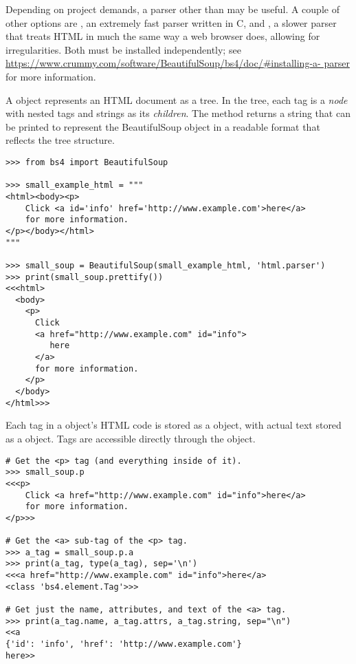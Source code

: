 \begin{info}
Depending on project demands, a parser other than  may be useful.
A couple of other options are , an extremely fast parser written in C, and , a slower parser that treats HTML in much the same way a web browser does, allowing for irregularities.
Both must be installed independently; see \url{https://www.crummy.com/software/BeautifulSoup/bs4/doc/\#installing-a-	parser} for more information.
\end{info}

\vspace{5mm}
A  object represents an HTML document as a tree.
In the tree, each tag is a \emph{node} with nested tags and strings as its \emph{children}.
The  method returns a string that can be printed to represent the BeautifulSoup object in a readable format that reflects the tree structure.

\begin{lstlisting}
>>> from bs4 import BeautifulSoup

>>> small_example_html = """
<html><body><p>
    Click <a id='info' href='http://www.example.com'>here</a>
    for more information.
</p></body></html>
"""

>>> small_soup = BeautifulSoup(small_example_html, 'html.parser')
>>> print(small_soup.prettify())
<<<html>
  <body>
    <p>
      Click
      <a href="http://www.example.com" id="info">
         here
      </a>
      for more information.
    </p>
  </body>
</html>>>
\end{lstlisting}

Each tag in a  object's HTML code is stored as a  object, with actual text stored as a  object.
Tags are accessible directly through the  object.

\begin{lstlisting}
# Get the <p> tag (and everything inside of it).
>>> small_soup.p
<<<p>
    Click <a href="http://www.example.com" id="info">here</a>
    for more information.
</p>>>

# Get the <a> sub-tag of the <p> tag.
>>> a_tag = small_soup.p.a
>>> print(a_tag, type(a_tag), sep='\n')
<<<a href="http://www.example.com" id="info">here</a>
<class 'bs4.element.Tag'>>>

# Get just the name, attributes, and text of the <a> tag.
>>> print(a_tag.name, a_tag.attrs, a_tag.string, sep="\n")
<<a
{'id': 'info', 'href': 'http://www.example.com'}
here>>
\end{lstlisting}

